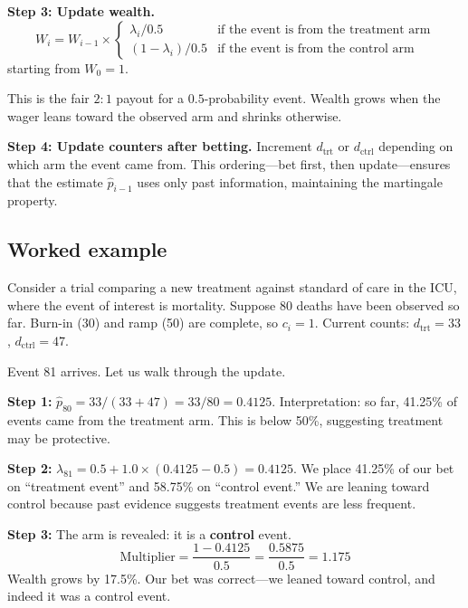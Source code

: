 \documentclass[10pt]{article}
\begin{document}
\textbf{Step 3: Update wealth.}
\begin{equation}
W_i = W_{i-1} \times
\begin{cases}
\lambda_i / 0.5 & \text{if the event is from the treatment arm} \\
(1 - \lambda_i) / 0.5 & \text{if the event is from the control arm}
\end{cases}
\end{equation}
starting from $W_0 = 1$.

This is the fair $2:1$ payout for a $0.5$-probability event. Wealth grows when the wager leans toward the observed arm and shrinks otherwise.

\textbf{Step 4: Update counters after betting.} Increment $d_{\text{trt}}$ or $d_{\text{ctrl}}$ depending on which arm the event came from. This ordering---bet first, then update---ensures that the estimate $\hat{p}_{i-1}$ uses only past information, maintaining the martingale property.

\subsection{Worked example}

Consider a trial comparing a new treatment against standard of care in the ICU, where the event of interest is mortality. Suppose 80 deaths have been observed so far. Burn-in (30) and ramp (50) are complete, so $c_i = 1$. Current counts: $d_{\text{trt}} = 33$, $d_{\text{ctrl}} = 47$.

Event 81 arrives. Let us walk through the update.

\textbf{Step 1:} $\hat{p}_{80} = 33 / (33 + 47) = 33/80 = 0.4125$. Interpretation: so far, 41.25\% of events came from the treatment arm. This is below 50\%, suggesting treatment may be protective.

\textbf{Step 2:} $\lambda_{81} = 0.5 + 1.0 \times (0.4125 - 0.5) = 0.4125$. We place 41.25\% of our bet on ``treatment event'' and 58.75\% on ``control event.'' We are leaning toward control because past evidence suggests treatment events are less frequent.

\textbf{Step 3:} The arm is revealed: it is a \textbf{control} event.
\begin{equation}
\text{Multiplier} = \frac{1 - 0.4125}{0.5} = \frac{0.5875}{0.5} = 1.175
\end{equation}
Wealth grows by 17.5\%. Our bet was correct---we leaned toward control, and indeed it was a control event.
\end{document}
